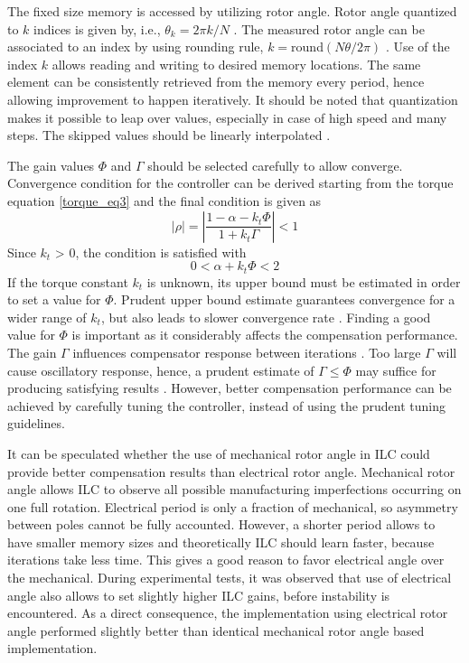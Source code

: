 The fixed size memory is accessed by utilizing rotor angle. Rotor angle quantized to $k$ indices is given by, i.e., $\theta_k = 2\pi k / N$ \cite{ILC:2012}. The measured rotor angle can be associated to an index by using rounding rule, $k = $round$(N \theta / 2 \pi)$ \cite{ILC:2012}. Use of the index $k$ allows reading and writing to desired memory locations. The same element can be consistently retrieved from the memory every period, hence allowing improvement to happen iteratively. It should be noted that quantization makes it possible to leap over values, especially in case of high speed and many steps. The skipped values should be linearly interpolated \cite{ILC:2012}.

The gain values $\Phi$ and $\Gamma$ should be selected carefully to allow converge. Convergence condition for the controller can be derived starting from the torque equation \eqref{torque_eq3} and the final condition is given as \cite{ILC:2004}
\begin{equation}
    \left| \rho \right| = \left| \frac{1-\alpha - k_t \Phi}{1 + k_t \Gamma} \right| < 1
\end{equation}
Since $k_t$ > 0, the condition is satisfied with \cite{ILC:2004}
\begin{equation}
    0 < \alpha + k_t \Phi < 2
\end{equation}
If the torque constant $k_t$ is unknown, its upper bound must be estimated in order to set a value for $\Phi$. Prudent upper bound estimate guarantees convergence for a wider range of $k_t$, but also leads to slower convergence rate \cite{ILC:2004, ILC:2005}. Finding a good value for $\Phi$ is important as it considerably affects the compensation performance. The gain $\Gamma$ influences compensator response between iterations \cite{ILC:2005}. Too large $\Gamma$ will cause oscillatory response, hence, a prudent estimate of $\Gamma \leq \Phi$ may suffice for producing satisfying results \cite{ILC:2004}. However, better compensation performance can be achieved by carefully tuning the controller, instead of using the prudent tuning guidelines.

It can be speculated whether the use of mechanical rotor angle in ILC could provide better compensation results than electrical rotor angle. Mechanical rotor angle allows ILC to observe all possible manufacturing imperfections occurring on one full rotation. Electrical period is only a fraction of mechanical, so asymmetry between poles cannot be fully accounted. However, a shorter period allows to have smaller memory sizes and theoretically ILC should learn faster, because iterations take less time. This gives a good reason to favor electrical angle over the mechanical. During experimental tests, it was observed that use of electrical angle also allows to set slightly higher ILC gains, before instability is encountered. As a direct consequence, the implementation using electrical rotor angle performed slightly better than identical mechanical rotor angle based implementation.


\clearpage
